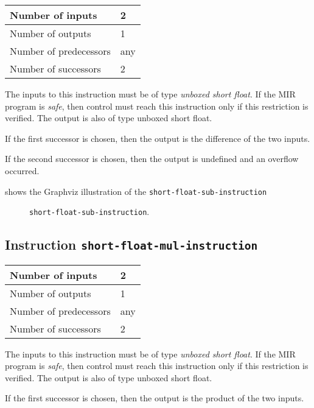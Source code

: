 \begin{tabular}{|l|l|}
\hline
Number of inputs & 2\\
\hline
Number of outputs & 1\\
\hline
Number of predecessors & any\\
\hline
Number of successors & 2\\
\hline
\end{tabular}

The inputs to this instruction must be of type \emph{unboxed short
  float}.  If the MIR program is \emph{safe}, then control must reach
this instruction only if this restriction is verified.  The output is
also of type unboxed short float.

If the first successor is chosen, then the output is
the difference of the two inputs.  

If the second successor is chosen, then the output is undefined and an
overflow occurred. 

 shows the Graphviz illustration of the
\texttt{short-float-sub-instruction}

\begin{figure}
\begin{center}
\end{center}
\caption{\label{fig-short-float-sub-instruction}
\texttt{short-float-sub-instruction}.}
\end{figure}

\subsection{Instruction \texttt{short-float-mul-instruction}}
\label{mir-instruction-short-float-mul}

\begin{tabular}{|l|l|}
\hline
Number of inputs & 2\\
\hline
Number of outputs & 1\\
\hline
Number of predecessors & any\\
\hline
Number of successors & 2\\
\hline
\end{tabular}

The inputs to this instruction must be of type \emph{unboxed short
  float}.  If the MIR program is \emph{safe}, then control must reach
this instruction only if this restriction is verified.  The output is
also of type unboxed short float.

If the first successor is chosen, then the output is
the product of the two inputs.  

